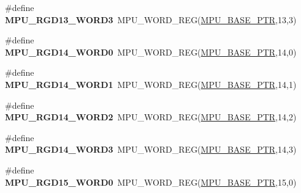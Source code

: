 \begin{DoxyCompactItemize}
\item 
\hypertarget{group___m_p_u___register___accessor___macros_ga6fa1f0f5f5c4969cb215e8606b20d4ae}{}\#define {\bfseries M\+P\+U\+\_\+\+R\+G\+D13\+\_\+\+W\+O\+R\+D3}~M\+P\+U\+\_\+\+W\+O\+R\+D\+\_\+\+R\+E\+G(\hyperlink{group___m_p_u___peripheral_gae2d60f80178d84225d77e5f0214d1f1d}{M\+P\+U\+\_\+\+B\+A\+S\+E\+\_\+\+P\+T\+R},13,3)\label{group___m_p_u___register___accessor___macros_ga6fa1f0f5f5c4969cb215e8606b20d4ae}

\item 
\hypertarget{group___m_p_u___register___accessor___macros_ga22f8322561f9b65b4778b6fe9e8b740c}{}\#define {\bfseries M\+P\+U\+\_\+\+R\+G\+D14\+\_\+\+W\+O\+R\+D0}~M\+P\+U\+\_\+\+W\+O\+R\+D\+\_\+\+R\+E\+G(\hyperlink{group___m_p_u___peripheral_gae2d60f80178d84225d77e5f0214d1f1d}{M\+P\+U\+\_\+\+B\+A\+S\+E\+\_\+\+P\+T\+R},14,0)\label{group___m_p_u___register___accessor___macros_ga22f8322561f9b65b4778b6fe9e8b740c}

\item 
\hypertarget{group___m_p_u___register___accessor___macros_ga70ad8e2942fb4c6b876d703f2cc5bff8}{}\#define {\bfseries M\+P\+U\+\_\+\+R\+G\+D14\+\_\+\+W\+O\+R\+D1}~M\+P\+U\+\_\+\+W\+O\+R\+D\+\_\+\+R\+E\+G(\hyperlink{group___m_p_u___peripheral_gae2d60f80178d84225d77e5f0214d1f1d}{M\+P\+U\+\_\+\+B\+A\+S\+E\+\_\+\+P\+T\+R},14,1)\label{group___m_p_u___register___accessor___macros_ga70ad8e2942fb4c6b876d703f2cc5bff8}

\item 
\hypertarget{group___m_p_u___register___accessor___macros_ga78f3383890d8a67747383a3504110239}{}\#define {\bfseries M\+P\+U\+\_\+\+R\+G\+D14\+\_\+\+W\+O\+R\+D2}~M\+P\+U\+\_\+\+W\+O\+R\+D\+\_\+\+R\+E\+G(\hyperlink{group___m_p_u___peripheral_gae2d60f80178d84225d77e5f0214d1f1d}{M\+P\+U\+\_\+\+B\+A\+S\+E\+\_\+\+P\+T\+R},14,2)\label{group___m_p_u___register___accessor___macros_ga78f3383890d8a67747383a3504110239}

\item 
\hypertarget{group___m_p_u___register___accessor___macros_ga5f61636900dad3d059c4f7d380dbe3e1}{}\#define {\bfseries M\+P\+U\+\_\+\+R\+G\+D14\+\_\+\+W\+O\+R\+D3}~M\+P\+U\+\_\+\+W\+O\+R\+D\+\_\+\+R\+E\+G(\hyperlink{group___m_p_u___peripheral_gae2d60f80178d84225d77e5f0214d1f1d}{M\+P\+U\+\_\+\+B\+A\+S\+E\+\_\+\+P\+T\+R},14,3)\label{group___m_p_u___register___accessor___macros_ga5f61636900dad3d059c4f7d380dbe3e1}

\item 
\hypertarget{group___m_p_u___register___accessor___macros_gaef24675f61fbf0a4d868707d947fa817}{}\#define {\bfseries M\+P\+U\+\_\+\+R\+G\+D15\+\_\+\+W\+O\+R\+D0}~M\+P\+U\+\_\+\+W\+O\+R\+D\+\_\+\+R\+E\+G(\hyperlink{group___m_p_u___peripheral_gae2d60f80178d84225d77e5f0214d1f1d}{M\+P\+U\+\_\+\+B\+A\+S\+E\+\_\+\+P\+T\+R},15,0)\label{group___m_p_u___register___accessor___macros_gaef24675f61fbf0a4d868707d947fa817}


\end{DoxyCompactItemize}
